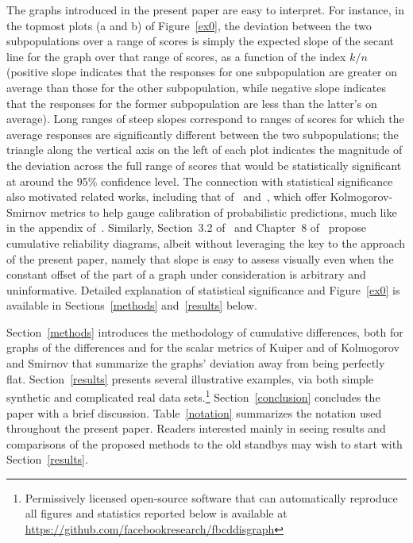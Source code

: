 \documentclass{article}
\begin{document}
The graphs introduced in the present paper are easy to interpret.
For instance, in the topmost plots (a and b) of Figure~\ref{ex0},
the deviation between the two subpopulations over a range of scores
is simply the expected slope of the secant line for the graph
over that range of scores, as a function of the index $k/n$
(positive slope indicates that the responses
for one subpopulation are greater on average than those
for the other subpopulation, while negative slope indicates
that the responses for the former subpopulation are less than the latter's
on average).
Long ranges of steep slopes correspond to ranges of scores for which
the average responses are significantly different
between the two subpopulations;
the triangle along the vertical axis on the left of each plot
indicates the magnitude of the deviation across the full range of scores
that would be statistically significant at around the 95\% confidence level.
The connection with statistical significance also motivated related works,
including that of~\cite{gupta-rahimi-ajanthan-mensink-sminchisescu-hartley}
and~\cite{roelofs-cain-shlens-mozer}, which offer Kolmogorov-Smirnov metrics
to help gauge calibration of probabilistic predictions,
much like in the appendix of~\cite{tygert}.
Similarly, Section~3.2 of~\cite{gneiting-balabdaoui-raftery} and
Chapter~8 of~\cite{wilks} propose cumulative reliability diagrams,
albeit without leveraging the key to the approach of the present paper,
namely that slope is easy to assess visually even when the constant offset
of the part of a graph under consideration is arbitrary and uninformative.
Detailed explanation of statistical significance and Figure~\ref{ex0}
is available in Sections~\ref{methods} and~\ref{results} below.

Section~\ref{methods} introduces the methodology of cumulative differences,
both for graphs of the differences and for the scalar metrics
of Kuiper and of Kolmogorov and Smirnov that summarize the graphs' deviation
away from being perfectly flat.
Section~\ref{results} presents several illustrative examples,
via both simple synthetic and complicated real data sets.\footnote{Permissively
licensed open-source software that can automatically reproduce all figures
and statistics reported below is available at
\url{https://github.com/facebookresearch/fbcddisgraph}}
Section~\ref{conclusion} concludes the paper with a brief discussion.
Table~\ref{notation} summarizes the notation used throughout the present paper.
Readers interested mainly in seeing results and comparisons
of the proposed methods to the old standbys may wish to start
with Section~\ref{results}.
\end{document}
